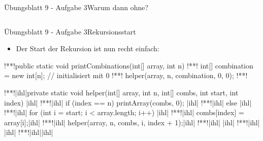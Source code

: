 \begin{frame}[c,fragile]{Übungsblatt 9 - Aufgabe 3\hfill Warum dann ohne?}
\begin{columns}[c,onlytextwidth]
\end{columns}
\end{frame}
\fi

\begin{frame}[fragile]{Übungsblatt 9 - Aufgabe 3\hfill Rekursionsstart}
    \SetupLstHl{}\begin{itemize}[<+(1)->]
        \item Der Start der Rekursion ist nun recht einfach:
    \end{itemize}
\begin{plainjava}
!**!public static void printCombinations(int[] array, int n) {
!**!    int[] combination = new int[n]; // initialisiert mit 0
!**!    helper(array, n, combination, 0, 0);
!**!}

!**!|ihl|private static void helper(int[] array, int n, int[] combs, int start, int index) {|ihl|
!**!|ihl|    if (index == n) { printArray(combs, 0); }|ihl|
!**!|ihl|    else {|ihl|
!**!|ihl|        for (int i = start; i < array.length; i++) {|ihl|
!**!|ihl|            combs[index] = array[i];|ihl|
!**!|ihl|            helper(array, n, combs, i, index + 1);|ihl|
!**!|ihl|        }|ihl|
!**!|ihl|    }|ihl|
!**!|ihl|}|ihl|
\end{plainjava}
\end{frame}

